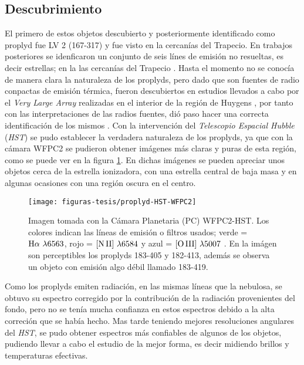 \subsection{ Descubrimiento}
\label{sec:descubrimiento-proplyds}

El primero de estos objetos descubierto y posteriormente identificado como proplyd fue LV 2 (167-317) y fue visto en la cercanías del Trapecio. En trabajos posteriores se idenficaron un conjunto de seis línes de emisión no resueltas, es decir estrellas; en la las cercanías del Trapecio \citep{Laques:1979}. Hasta el momento no se conocía de manera clara la naturaleza de los proplyds, pero dado que son fuentes de radio conpactas de emisión térmica, fueron descubiertos en estudios llevados a cabo por el \textit{Very Large Array} realizadas en el interior de la región de Huygens \citep{Garay:1987}, por tanto con las interpretaciones de las radios fuentes, dió paso  hacer una correcta identificación de los mismos \citep{Churchwell:1987}. Con la intervención del \textit{Telescopio Espacial Hubble} (\textit{HST}) se pudo establecer la verdadera naturaleza de los proplyds, ya que con la cámara WFPC2 \citep{Odell:1994} se pudieron obtener imágenes más claras y puras de esta región, como se puede ver en la figura \ref{fig:proplyd-hst}. En dichas imágenes se pueden apreciar unos objetos cerca de la estrella ionizadora, con una estrella central de baja masa y en algunas ocasiones con una región oscura en el centro.\\ 

\begin{figure}
  \centering
  \texttt{[image: figuras-tesis/proplyd-HST-WFPC2]}
  \caption{Imagen tomada con la Cámara Planetaria (PC) WFPC2-HST. Los colores indican las líneas de emisión o filtros usados;  verde = \(\mathrm{H}\alpha~\lambda6563\), rojo =  \(\mathrm{[N\,II]}~\lambda6584\) y  azul = \(\mathrm{[O\,III]}~\lambda5007\) \citep{Bally:1998a}. En la imágen son perceptibles los proplyds 183-405 y 182-413, además se observa un objeto con emisión algo débil llamado 183-419.}
  \label{fig:proplyd-hst}
\end{figure}
  

Como los proplyds emiten radiación, en las mismas líneas que la nebulosa, se obtuvo su espectro  corregido por la contribución de la radiación provenientes del fondo, pero no se tenía mucha confianza en estos espectros debido a la alta correción que se había hecho. Mas tarde teniendo mejores resoluciones angulares del \textit{HST}, se pudo obtener espectros más confiables de algunos de los objetos, pudiendo llevar a cabo el estudio de la mejor forma, es decir midiendo brillos y temperaturas efectivas.\\


